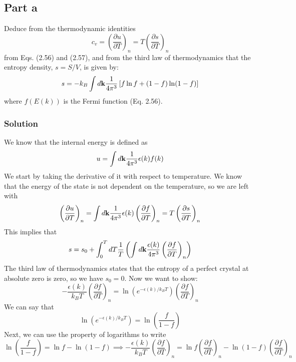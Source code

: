 \documentclass[12pt]{article}
\begin{document}
\subsection{Part a}
Deduce from the thermodynamic identities 
\[
c_v = \left( \frac{\partial u}{\partial T} \right)_n = T \left( \frac{\partial s}{\partial T} \right)_n
\]
from Eqs. (2.56) and (2.57), and from the third law of thermodynamics that the entropy density, $s = S/V$, is given by:
\[
s = -k_B \int d\vb{k} \frac{1}{4\pi^3} \left[ f \ln f + (1 - f) \ln (1 - f) \right]
\]
where $f(E(k))$ is the Fermi function (Eq. 2.56).

\subsubsection{Solution}
We know that the internal energy is defined as
\begin{equation}
    u = \int d \vb{k} \frac{1}{4\pi^3} \epsilon(k) f(k)
\end{equation}
We start by taking the derivative of it with respect to temperature. We know that the energy of the state is not dependent on the temperature, so we are left with
\begin{equation}
    \left( \frac{\partial u}{\partial T} \right)_n = \int d \vb{k} \frac{1}{4\pi^3} \epsilon(k) \left( \frac{\partial f}{\partial T} \right)_n = T \left( \frac{\partial s}{\partial T} \right)_n
\end{equation}
This implies that
\begin{equation}
    s = s_0 + \int_{0}^{T} dT \frac{1}{T} \left( \int d\vb{k} \frac{\epsilon (k)}{4\pi ^{3}} \left( \frac{\partial f}{\partial T} \right)_n  \right)
\end{equation}
The third law of thermodynamics states that the entropy of a perfect crystal at absolute zero is zero, so we have \( s_0 = 0 \). Now we want to show:
\begin{equation}
    -\frac{\epsilon (k)}{k_B T} \left( \frac{\partial f}{\partial T} \right)_n = \ln (e^{-\epsilon (k) / k_B T}) \left( \frac{\partial f}{\partial T} \right)_n
\end{equation}
We can say that
\begin{equation}
    \ln (e^{-\epsilon (k) / k_B T}) = \ln \left(\frac{f}{1-f}\right)
\end{equation}
Next, we can use the property of logarithms to write
\begin{equation}
    \ln \left(\frac{f}{1-f}\right) = \ln f - \ln (1-f) \implies -\frac{\epsilon (k)}{k_B T} \left( \frac{\partial f}{\partial T} \right)_n = \ln f \left( \frac{\partial f}{\partial T} \right)_n - \ln (1-f) \left( \frac{\partial f}{\partial T} \right)_n
\end{equation}
\end{document}
